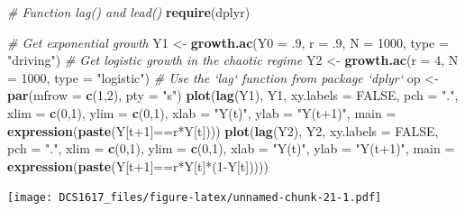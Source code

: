 \documentclass[]{book}
\newenvironment{Shaded}{\begin{snugshade}}{\end{snugshade}}
\newcommand{\KeywordTok}[1]{\textcolor[rgb]{0.13,0.29,0.53}{\textbf{{#1}}}}
\newcommand{\DataTypeTok}[1]{\textcolor[rgb]{0.13,0.29,0.53}{{#1}}}
\newcommand{\DecValTok}[1]{\textcolor[rgb]{0.00,0.00,0.81}{{#1}}}
\newcommand{\StringTok}[1]{\textcolor[rgb]{0.31,0.60,0.02}{{#1}}}
\newcommand{\CommentTok}[1]{\textcolor[rgb]{0.56,0.35,0.01}{\textit{{#1}}}}
\newcommand{\OtherTok}[1]{\textcolor[rgb]{0.56,0.35,0.01}{{#1}}}
\newcommand{\NormalTok}[1]{{#1}}
\begin{document}
\begin{Shaded}
\begin{Highlighting}[]
\CommentTok{# Function lag() and lead()}
\KeywordTok{require}\NormalTok{(dplyr)}

\CommentTok{# Get exponential growth}
\NormalTok{Y1 <-}\StringTok{ }\KeywordTok{growth.ac}\NormalTok{(}\DataTypeTok{Y0 =} \NormalTok{.}\DecValTok{9}\NormalTok{, }\DataTypeTok{r =} \NormalTok{.}\DecValTok{9}\NormalTok{, }\DataTypeTok{N =} \DecValTok{1000}\NormalTok{, }\DataTypeTok{type =} \StringTok{"driving"}\NormalTok{)}
\CommentTok{# Get logistic growth in the chaotic regime}
\NormalTok{Y2 <-}\StringTok{ }\KeywordTok{growth.ac}\NormalTok{(}\DataTypeTok{r =} \DecValTok{4}\NormalTok{, }\DataTypeTok{N =} \DecValTok{1000}\NormalTok{, }\DataTypeTok{type =} \StringTok{"logistic"}\NormalTok{)}
\CommentTok{# Use the `lag` function from package `dplyr`}
\NormalTok{op <-}\StringTok{ }\KeywordTok{par}\NormalTok{(}\DataTypeTok{mfrow =} \KeywordTok{c}\NormalTok{(}\DecValTok{1}\NormalTok{,}\DecValTok{2}\NormalTok{), }\DataTypeTok{pty =} \StringTok{"s"}\NormalTok{)}
\KeywordTok{plot}\NormalTok{(}\KeywordTok{lag}\NormalTok{(Y1), Y1, }\DataTypeTok{xy.labels =} \OtherTok{FALSE}\NormalTok{, }\DataTypeTok{pch =} \StringTok{"."}\NormalTok{, }\DataTypeTok{xlim =} \KeywordTok{c}\NormalTok{(}\DecValTok{0}\NormalTok{,}\DecValTok{1}\NormalTok{), }\DataTypeTok{ylim =} \KeywordTok{c}\NormalTok{(}\DecValTok{0}\NormalTok{,}\DecValTok{1}\NormalTok{), }\DataTypeTok{xlab =} \StringTok{"Y(t)"}\NormalTok{, }\DataTypeTok{ylab =} \StringTok{"Y(t+1)"}\NormalTok{,}
     \DataTypeTok{main =} \KeywordTok{expression}\NormalTok{(}\KeywordTok{paste}\NormalTok{(Y[t}\DecValTok{+1}\NormalTok{]==r*Y[t])))}
\KeywordTok{plot}\NormalTok{(}\KeywordTok{lag}\NormalTok{(Y2), Y2, }\DataTypeTok{xy.labels =} \OtherTok{FALSE}\NormalTok{, }\DataTypeTok{pch =} \StringTok{"."}\NormalTok{, }\DataTypeTok{xlim =} \KeywordTok{c}\NormalTok{(}\DecValTok{0}\NormalTok{,}\DecValTok{1}\NormalTok{), }\DataTypeTok{ylim =} \KeywordTok{c}\NormalTok{(}\DecValTok{0}\NormalTok{,}\DecValTok{1}\NormalTok{), }\DataTypeTok{xlab =} \StringTok{"Y(t)"}\NormalTok{, }\DataTypeTok{ylab =} \StringTok{"Y(t+1)"}\NormalTok{,}
     \DataTypeTok{main =} \KeywordTok{expression}\NormalTok{(}\KeywordTok{paste}\NormalTok{(Y[t}\DecValTok{+1}\NormalTok{]==r*Y[t]*(}\DecValTok{1}\NormalTok{-Y[t]))))}
\end{Highlighting}
\end{Shaded}

\texttt{[image: DCS1617\_files/figure-latex/unnamed-chunk-21-1.pdf]}
\end{document}
